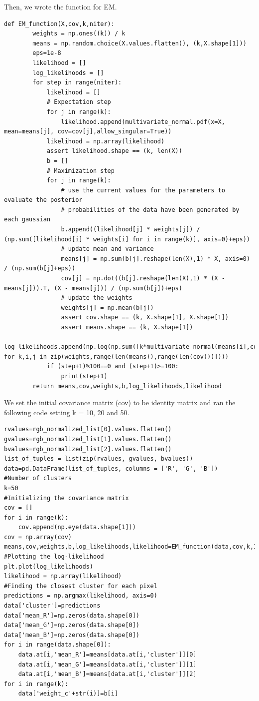 \documentclass{article}      %
\begin{document}
Then, we wrote the function for EM.
\begin{lstlisting}
def EM_function(X,cov,k,niter):    
        weights = np.ones((k)) / k
        means = np.random.choice(X.values.flatten(), (k,X.shape[1]))
        eps=1e-8
        likelihood = []
        log_likelihoods = []
        for step in range(niter):
            likelihood = []
            # Expectation step
            for j in range(k):
                likelihood.append(multivariate_normal.pdf(x=X, mean=means[j], cov=cov[j],allow_singular=True))
            likelihood = np.array(likelihood)
            assert likelihood.shape == (k, len(X))
            b = []
            # Maximization step 
            for j in range(k):
                # use the current values for the parameters to evaluate the posterior
                # probabilities of the data have been generated by each gaussian
                b.append((likelihood[j] * weights[j]) / (np.sum([likelihood[i] * weights[i] for i in range(k)], axis=0)+eps))
                # update mean and variance
                means[j] = np.sum(b[j].reshape(len(X),1) * X, axis=0) / (np.sum(b[j]+eps))
                cov[j] = np.dot((b[j].reshape(len(X),1) * (X - means[j])).T, (X - means[j])) / (np.sum(b[j])+eps)
                # update the weights
                weights[j] = np.mean(b[j])
                assert cov.shape == (k, X.shape[1], X.shape[1])
                assert means.shape == (k, X.shape[1])
            log_likelihoods.append(np.log(np.sum([k*multivariate_normal(means[i],cov[j],allow_singular=True).pdf(X) for k,i,j in zip(weights,range(len(means)),range(len(cov)))])))
            if (step+1)%100==0 and (step+1)>=100:
                print(step+1)
        return means,cov,weights,b,log_likelihoods,likelihood
\end{lstlisting}

We set the initial covariance matrix (cov) to be identity matrix and ran the following code setting k = 10, 20 and 50.

\begin{lstlisting}
rvalues=rgb_normalized_list[0].values.flatten()
gvalues=rgb_normalized_list[1].values.flatten()
bvalues=rgb_normalized_list[2].values.flatten()
list_of_tuples = list(zip(rvalues, gvalues, bvalues))  
data=pd.DataFrame(list_of_tuples, columns = ['R', 'G', 'B'])
#Number of clusters
k=50
#Initializing the covariance matrix
cov = []
for i in range(k):
    cov.append(np.eye(data.shape[1]))
cov = np.array(cov)
means,cov,weights,b,log_likelihoods,likelihood=EM_function(data,cov,k,1000)
#Plotting the log-likelihood
plt.plot(log_likelihoods)
likelihood = np.array(likelihood)
#Finding the closest cluster for each pixel
predictions = np.argmax(likelihood, axis=0)
data['cluster']=predictions
data['mean_R']=np.zeros(data.shape[0])
data['mean_G']=np.zeros(data.shape[0])
data['mean_B']=np.zeros(data.shape[0])
for i in range(data.shape[0]):
    data.at[i,'mean_R']=means[data.at[i,'cluster']][0]
    data.at[i,'mean_G']=means[data.at[i,'cluster']][1]
    data.at[i,'mean_B']=means[data.at[i,'cluster']][2]
for i in range(k):
    data['weight_c'+str(i)]=b[i]
\end{lstlisting}
\end{document}

